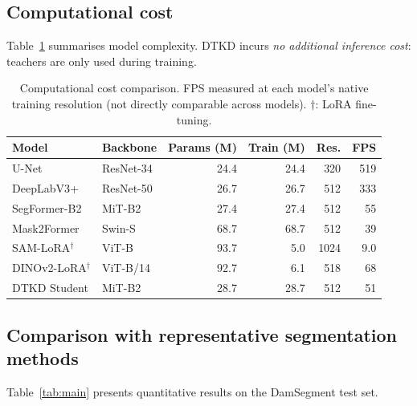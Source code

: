 \documentclass[review,authoryear]{elsarticle}
\begin{document}
\subsection{Computational cost}

Table~\ref{tab:cost} summarises model complexity. DTKD incurs \emph{no additional inference cost}: teachers are only used during training.

\begin{table}[t]
\centering
\caption{Computational cost comparison. FPS measured at each model's native training resolution (not directly comparable across models). $\dagger$: LoRA fine-tuning.}
\label{tab:cost}
\begin{tabular}{llrrrr}
\toprule
Model & Backbone & Params (M) & Train (M) & Res. & FPS \\
\midrule
U-Net & ResNet-34 & 24.4 & 24.4 & 320 & 519 \\
DeepLabV3+ & ResNet-50 & 26.7 & 26.7 & 512 & 333 \\
SegFormer-B2 & MiT-B2 & 27.4 & 27.4 & 512 & 55 \\
Mask2Former & Swin-S & 68.7 & 68.7 & 512 & 39 \\
SAM-LoRA$^\dagger$ & ViT-B & 93.7 & 5.0 & 1024 & 9.0 \\
DINOv2-LoRA$^\dagger$ & ViT-B/14 & 92.7 & 6.1 & 518 & 68 \\
\midrule
DTKD Student & MiT-B2 & 28.7 & 28.7 & 512 & 51 \\
\bottomrule
\end{tabular}
\end{table}

\subsection{Comparison with representative segmentation methods}

Table~\ref{tab:main} presents quantitative results on the DamSegment test set.
\end{document}
